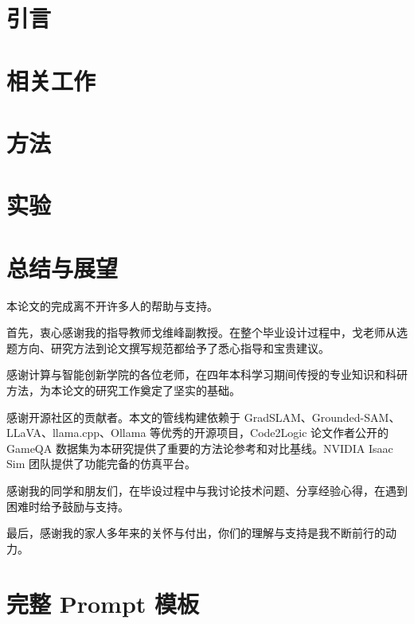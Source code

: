 \documentclass[type=bachelor,oneside]{fduthesis}
\begin{document}
\mainmatter

\chapter{引言}


\chapter{相关工作}


\chapter{方法}


\chapter{实验}


\chapter{总结与展望}


\backmatter
\printbibliography

\begin{acknowledgements}
本论文的完成离不开许多人的帮助与支持。

首先，衷心感谢我的指导教师戈维峰副教授。在整个毕业设计过程中，戈老师从选题方向、研究方法到论文撰写规范都给予了悉心指导和宝贵建议。

感谢计算与智能创新学院的各位老师，在四年本科学习期间传授的专业知识和科研方法，为本论文的研究工作奠定了坚实的基础。

感谢开源社区的贡献者。本文的管线构建依赖于 GradSLAM、Grounded-SAM、LLaVA、llama.cpp、Ollama 等优秀的开源项目，Code2Logic 论文作者公开的 GameQA 数据集为本研究提供了重要的方法论参考和对比基线。NVIDIA Isaac Sim 团队提供了功能完备的仿真平台。

感谢我的同学和朋友们，在毕设过程中与我讨论技术问题、分享经验心得，在遇到困难时给予鼓励与支持。

最后，感谢我的家人多年来的关怀与付出，你们的理解与支持是我不断前行的动力。
\end{acknowledgements}

\appendix

\chapter{完整 Prompt 模板}
\end{document}
